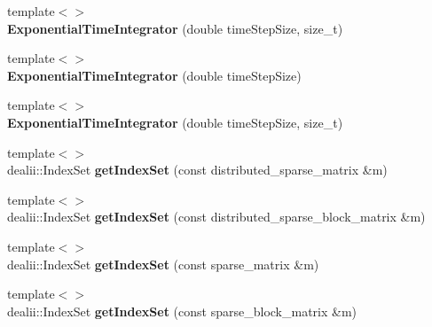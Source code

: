 \begin{DoxyCompactItemize}
\item 
\hypertarget{classnatrium_1_1ExponentialTimeIntegrator_acbd606f38f9c5c0b4cb9b9fc817f1186}{
{\footnotesize template$<$$>$ }\\{\bfseries ExponentialTimeIntegrator} (double timeStepSize, size\_\-t)}
\label{classnatrium_1_1ExponentialTimeIntegrator_acbd606f38f9c5c0b4cb9b9fc817f1186}

\item 
\hypertarget{classnatrium_1_1ExponentialTimeIntegrator_a9fbf0f44e2d68eab2df6d767e6f08c77}{
{\footnotesize template$<$$>$ }\\{\bfseries ExponentialTimeIntegrator} (double timeStepSize)}
\label{classnatrium_1_1ExponentialTimeIntegrator_a9fbf0f44e2d68eab2df6d767e6f08c77}

\item 
\hypertarget{classnatrium_1_1ExponentialTimeIntegrator_a716b2f09970240253c9175e3ad5e3965}{
{\footnotesize template$<$$>$ }\\{\bfseries ExponentialTimeIntegrator} (double timeStepSize, size\_\-t)}
\label{classnatrium_1_1ExponentialTimeIntegrator_a716b2f09970240253c9175e3ad5e3965}

\item 
\hypertarget{classnatrium_1_1ExponentialTimeIntegrator_a04d6a47d38318ab92ba4bd22b834d6c3}{
{\footnotesize template$<$$>$ }\\dealii::IndexSet {\bfseries getIndexSet} (const distributed\_\-sparse\_\-matrix \&m)}
\label{classnatrium_1_1ExponentialTimeIntegrator_a04d6a47d38318ab92ba4bd22b834d6c3}

\item 
\hypertarget{classnatrium_1_1ExponentialTimeIntegrator_aa58b4f252c2f19808f10102d60eed3a9}{
{\footnotesize template$<$$>$ }\\dealii::IndexSet {\bfseries getIndexSet} (const distributed\_\-sparse\_\-block\_\-matrix \&m)}
\label{classnatrium_1_1ExponentialTimeIntegrator_aa58b4f252c2f19808f10102d60eed3a9}

\item 
\hypertarget{classnatrium_1_1ExponentialTimeIntegrator_a6ea6d696834a57e0e8af03558ffc1d5b}{
{\footnotesize template$<$$>$ }\\dealii::IndexSet {\bfseries getIndexSet} (const sparse\_\-matrix \&m)}
\label{classnatrium_1_1ExponentialTimeIntegrator_a6ea6d696834a57e0e8af03558ffc1d5b}

\item 
\hypertarget{classnatrium_1_1ExponentialTimeIntegrator_a0d43b0a3b92ced2b9b7755549742baa0}{
{\footnotesize template$<$$>$ }\\dealii::IndexSet {\bfseries getIndexSet} (const sparse\_\-block\_\-matrix \&m)}
\label{classnatrium_1_1ExponentialTimeIntegrator_a0d43b0a3b92ced2b9b7755549742baa0}

\end{DoxyCompactItemize}


